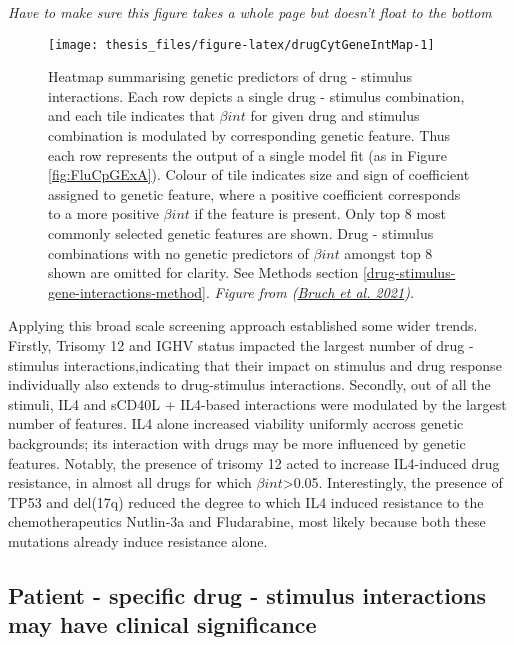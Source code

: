 \documentclass[11pt, a4paper, twosided]{book}
\begin{document}
\emph{Have to make sure this figure takes a whole page but doesn't float to the bottom}


\begin{figure}

{\centering \texttt{[image: thesis\_files/figure-latex/drugCytGeneIntMap-1]} 

}

\caption{Heatmap summarising genetic predictors of drug - stimulus interactions. Each row depicts a single drug - stimulus combination, and each tile indicates that \(\beta{int}\) for given drug and stimulus combination is modulated by corresponding genetic feature. Thus each row represents the output of a single model fit (as in Figure \ref{fig:FluCpGExA}). Colour of tile indicates size and sign of coefficient assigned to genetic feature, where a positive coefficient corresponds to a more positive \(\beta{int}\) if the feature is present. Only top 8 most commonly selected genetic features are shown. Drug - stimulus combinations with no genetic predictors of \(\beta{int}\) amongst top 8 shown are omitted for clarity. See Methods section \ref{drug-stimulus-gene-interactions-method}. \emph{Figure from (\protect\hyperlink{ref-Giles2021}{Bruch et al. 2021}).}}\label{fig:drugCytGeneIntMap}
\end{figure}
Applying this broad scale screening approach established some wider trends. Firstly, Trisomy 12 and IGHV status impacted the largest number of drug - stimulus interactions,indicating that their impact on stimulus and drug response individually also extends to drug-stimulus interactions. Secondly, out of all the stimuli, IL4 and sCD40L + IL4-based interactions were modulated by the largest number of features. IL4 alone increased viability uniformly accross genetic backgrounds; its interaction with drugs may be more influenced by genetic features. Notably, the presence of trisomy 12 acted to increase IL4-induced drug resistance, in almost all drugs for which \(\beta{int}\)\textgreater0.05. Interestingly, the presence of TP53 and del(17q) reduced the degree to which IL4 induced resistance to the chemotherapeutics Nutlin-3a and Fludarabine, most likely because both these mutations already induce resistance alone.

\hypertarget{drug-stimulus-gene-predictor-profile}{%
\subsection{Patient - specific drug - stimulus interactions may have clinical significance}\label{drug-stimulus-gene-predictor-profile}}
\end{document}

